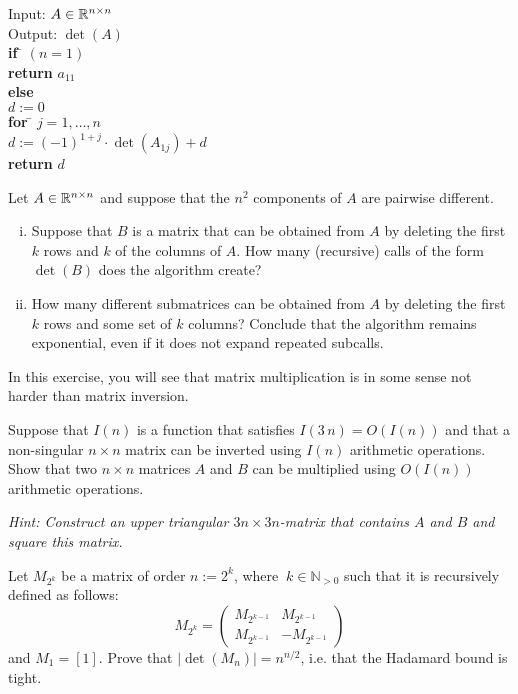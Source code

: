 \documentclass[11pt]{article}
\begin{document}
\begin{tabbing}
  Input: $A \in \mathbb{R}^{n \times n}$ \\
  Output: $\det(A)$ \\
  
  {\bf if} \= $(n=1)$ \\
           \> {\bf return} $a_{11}$ \\
  {\bf else} \\
           \> $d:=0$  \\
           \> {\bf for } \= $j=1,\dots,n$ \\
           \>            \> $d:= (-1)^{1+j}⋅ \det(A_{1j}) +d$\\
           \> {\bf return} $d$   
\end{tabbing}

Let $A \in \mathbb{R}^{n \times n}$  and suppose that the $n^2$ components of $A$ are pairwise different.
\begin{enumerate}[i)]
\item
Suppose that $B$ is a matrix that can be obtained from $A$ by deleting the first $k$ rows and $k$ of the columns of $A$. How many (recursive) calls of the form $\det(B)$ does the algorithm create? 

\item How many different submatrices can be obtained from $A$ by deleting the first $k$ rows and some set of $k$ columns? Conclude that the algorithm remains exponential, even if it does not expand repeated subcalls. 
\end{enumerate}
  
\problem In this exercise, you will see that matrix multiplication is in some sense not harder than matrix inversion. 

Suppose that $I(n)$ is a function that satisfies $I(3\,n) = O(I(n))$ and that a non-singular  $n \times n$ matrix can be inverted using $I(n)$ arithmetic operations. Show that two $n \times n $ matrices $A$ and $B$ can be multiplied using $O(I(n))$ arithmetic operations. 

\emph{Hint: Construct an upper triangular $3n \times 3n$-matrix that contains $A$ and $B$ and square this matrix.}

\problemstar Let $M_{2^k}$ be a matrix of order $n:=2^k$, where $\ k \in \mathbb{N}_{>0}$ such that it is recursively defined as follows:
\begin{equation}
M_{2^k}=
\begin{pmatrix}
    M_{2^{k-1}} & M_{2^{k-1}} \\ 
    M_{2^{k-1}} & -M_{2^{k-1}} 
  \end{pmatrix}
\end{equation}
and $M_1=[1]$. Prove that $|\det(M_{n})|=n^{n/2}$, i.e. that the Hadamard bound is tight.
\end{document}
